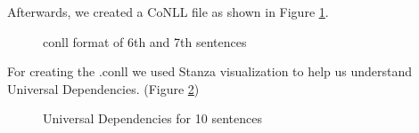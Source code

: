 \documentclass[12pt, a4paper]{article}
\begin{document}
Afterwards, we created a CoNLL file as shown in Figure \ref{parsing_conll}. 
\begin{figure}[H]
	\caption{conll format of 6th and 7th sentences}
	\label{parsing_conll}
\end{figure}

For creating the .conll we used Stanza visualization to help us understand Universal Dependencies. (Figure \ref{parsing_examples_UDtree})
\begin{figure}[H]
	\caption{Universal Dependencies for 10 sentences}
	\label{parsing_examples_UDtree}
\end{figure}
\end{document}
